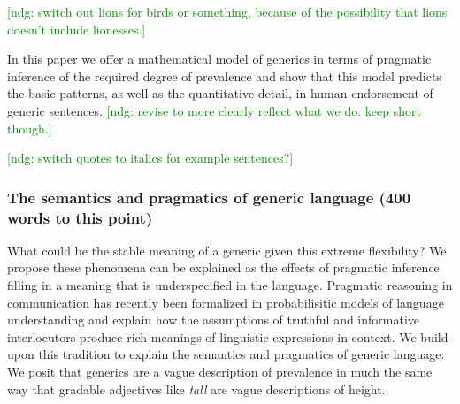 \documentclass[10pt,letterpaper]{article}
\newcommand{\ndg}[1]{\textcolor{Green}{[ndg: #1]}}
\begin{document}
\ndg{switch out lions for birds or something, because of the possibility that lions doesn't include lionesses.}

In this paper we offer a mathematical model of generics in terms of pragmatic inference of the required degree of prevalence and show that this model predicts the basic patterns, as well as the quantitative detail, in human endorsement of generic sentences. \ndg{revise to more clearly reflect what we do. keep short though.}

\ndg{switch quotes to italics for example sentences?}


\subsubsection{The semantics and pragmatics of generic language  (400 words to this point)}

What could be the stable meaning of a generic given this extreme flexibility? 
We propose these phenomena can be explained as the effects of pragmatic inference filling in a meaning that is underspecified in the language. 
Pragmatic reasoning in communication has recently been formalized in probabilisitic models of language understanding \cite{Frank2012, Goodman2013, Franke2009} and explain how the assumptions of truthful and informative interlocutors \cite{Clark1996, Grice1975, Levinson2000} produce rich meanings of linguistic expressions in context. 
We build upon this tradition to explain the semantics and pragmatics of generic language: We posit that generics are a vague description of prevalence in much the same way that gradable adjectives like \emph{tall} are vague descriptions of height. 
\end{document}
